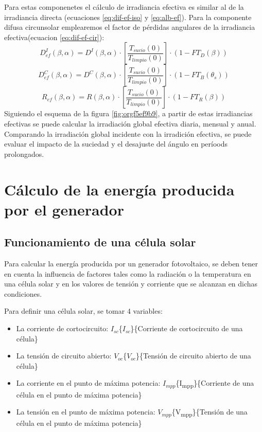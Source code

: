Para estas componenetes el cálculo de irradiancia efectiva es similar al de la irradiancia directa (ecuaciones \ref{eq:dif-ef-iso} y \ref{eq:alb-ef}). Para la componente difusa circunsolar emplearemos el factor de pérdidas angulares de la irradiancia efectiva(ecuacion \ref{eq:dif-ef-cir}):
\begin{equation}
D_{ef}^I(\beta ,\alpha)=D^I(\beta ,\alpha)\cdot[\frac{T_{sucio}(0)}{T_{limpio}(0)}]\cdot (1-FT_D(\beta))
\label{eq:dif-ef-iso}
\end{equation}
\begin{equation}
D_{ef}^C(\beta ,\alpha)=D^C(\beta ,\alpha)\cdot[\frac{T_{sucio}(0)}{T_{limpio}(0)}]\cdot (1-FT_B(\theta_s))
\label{eq:dif-ef-cir}
\end{equation}
\begin{equation}
R_{ef}(\beta ,\alpha)=R(\beta ,\alpha)\cdot[\frac{T_{sucio}(0)}{T_{limpio}(0)}]\cdot (1-FT_R(\beta))
\label{eq:alb-ef}
\end{equation}
Siguiendo el esquema de la figura \ref{fig:orgf5ef9b9}, a partir de estas irradiancias efectivas se puede calcular la irradiación global efectiva diaria, mensual y anual. Comparando la irradiación global incidente con la irradición efectiva, se puede evaluar el impacto de la suciedad y el desajuste del ángulo en períoods prolongados.

\section{Cálculo de la energía producida por el generador}
\label{sec:org300a2b2}
\label{sec:calculo-energia-producida-generador}

\subsection{Funcionamiento de una célula solar}
\label{sec:org3052a24}
\label{subsec:funcionamiento-celula-solar}
Para calcular la energía producida por un generador fotovoltaico, se deben tener en cuenta la influencia de factores tales como la radiación o la temperatura en una célula solar y en los valores de tensión y corriente que se alcanzan en dichas condiciones.

Para definir una célula solar, se tomar 4 variables:
\begin{itemize}
\item La corriente de cortocircuito: \(I_{sc}\)\nomenclature[Isc]\{\(I_{sc}\)\}\{Corriente de cortocircuito de una célula\}
\item La tensión de circuito abierto: \(V_{oc}\)\nomenclature[VOC]\{\(V_{oc}\)\}\{Tensión de circuito abierto de una célula\}
\item La corriente en el punto de máxima potencia: \(I_{mpp}\)\nomenclature[Impp]\{I\textsubscript{mpp}\}\{Corriente de una célula en el punto de máxima potencia\}
\item La tensión en el punto de máxima potencia: \(V_{mpp}\)\nomenclature[Vmpp]\{V\textsubscript{mpp}\}\{Tensión de una célula en el punto de máxima potencia\}
\end{itemize}

